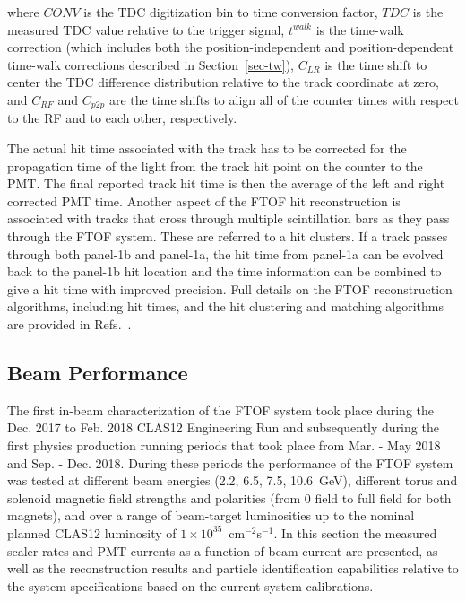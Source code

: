 \documentclass[3p,times,twocolumn]{elsarticle}
\begin{document}
\noindent
where $CONV$ is the TDC digitization bin to time conversion factor, $TDC$ is the measured TDC value
relative to the trigger signal, $t^{walk}$ is the time-walk correction (which includes both the
position-independent and position-dependent time-walk corrections described in Section~\ref{sec-tw}),
$C_{LR}$ is the time shift to center the TDC difference distribution relative to the track coordinate at zero,
and $C_{RF}$ and $C_{p2p}$ are the time shifts to align all of the counter times with respect to the RF and to
each other, respectively.

The actual hit time associated with the track has to be corrected for the propagation time of the light from
the track hit point on the counter to the PMT. The final reported track hit time is then the average of
the left and right corrected PMT time. Another aspect of the FTOF hit reconstruction is associated
with tracks that cross through multiple scintillation bars as they pass through the FTOF system. These are
referred to a hit clusters. If a track passes through both panel-1b and panel-1a, the hit time from panel-1a
can be evolved back to the panel-1b hit location and the time information can be combined to give a hit time
with improved precision. Full details on the FTOF reconstruction algorithms, including hit times, and the hit
clustering and matching algorithms are provided in Refs.~\cite{recon-nim,ftof-recon}.

\subsection{Beam Performance}  
\label{sec:beam}

The first in-beam characterization of the FTOF system took place during the Dec. 2017 to Feb. 2018
CLAS12 Engineering Run and subsequently during the first physics production running periods that took
place from Mar. - May 2018 and Sep. - Dec. 2018. During these periods the performance of the FTOF
system was tested at different beam energies (2.2, 6.5, 7.5, 10.6~GeV), different torus and solenoid
magnetic field strengths and polarities (from 0 field to full field for both magnets), and over a range of
beam-target luminosities up to the nominal planned CLAS12 luminosity of $1 \times 10^{35}$~cm$^{-2}$s$^{-1}$.
In this section the measured scaler rates and PMT currents as a function of beam current are presented, as
well as the reconstruction results and particle identification capabilities relative to the system specifications
based on the current system calibrations.
\end{document}
